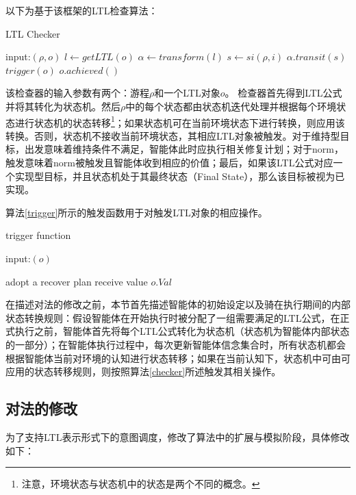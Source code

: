 以下为基于该框架的LTL检查算法：
\begin{algorithm} %
\caption{LTL Checker}\label{checker}
\begin{algorithmic}[1]
\STATE input:$(\rho, o)$
\STATE $l \gets getLTL(o)$
\STATE $\alpha \gets transform(l)$ 
  \STATE $s \gets si(\rho, i)$
    \STATE $\alpha.transit(s)$
    \ELSE
    \STATE $trigger(o)$
  \ENDIF
\ENDFOR
{}
  \STATE $o.achieved()$
\ENDIF
\end{algorithmic}
\end{algorithm}
该检查器的输入参数有两个：游程$\rho$和一个LTL对象$o$。
%
检查器首先得到LTL公式并将其转化为状态机。然后$\rho$中的每个状态都由状态机迭代处理并根据每个环境状态进行状态机的状态转移\footnote{注意，环境状态与状态机中的状态是两个不同的概念。}；如果状态机可在当前环境状态下进行转换，则应用该转换。否则，状态机不接收当前环境状态，其相应LTL对象被触发。对于维持型目标，出发意味着维持条件不满足，智能体此时应执行相关修复计划；对于norm，触发意味着norm被触发且智能体收到相应的价值；最后，如果该LTL公式对应一个实现型目标，并且状态机处于其最终状态（Final State），那么该目标被视为已实现。

算法\ref{trigger}所示的触发函数用于对触发LTL对象的相应操作。
\begin{algorithm} %
\caption{trigger function}\label{trigger}
\begin{algorithmic}[1]
\STATE input:$(o)$

\STATE adopt a recover plan
\ELSE
{}
\STATE receive value $o.Val$
\ENDIF
\ENDIF

\end{algorithmic}
\end{algorithm}

在描述对\SA 法的修改之前，本节首先描述智能体的初始设定以及骑在执行期间的内部状态转换规则：假设智能体在开始执行时被分配了一组需要满足的LTL公式，在正式执行之前，智能体首先将每个LTL公式转化为状态机（状态机为智能体内部状态的一部分）；在智能体执行过程中，每次更新智能体信念集合时，所有状态机都会根据智能体当前对环境的认知进行状态转移；如果在当前认知下，状态机中可由可应用的状态转移规则，则按照算法\ref{checker}所述触发其相关操作。

\subsection{对\SA 法的修改}
为了支持LTL表示形式下的意图调度，\SAT 修改了\SA 算法中的扩展与模拟阶段，具体修改如下：
